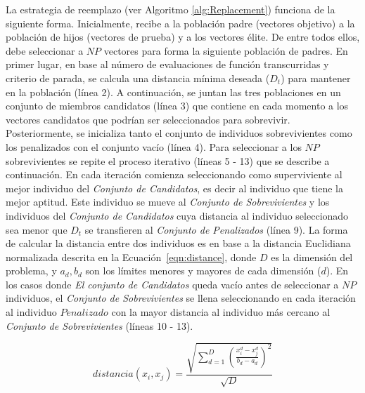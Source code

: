 La estrategia de reemplazo (ver Algoritmo \ref{alg:Replacement}) funciona de la siguiente forma.
%
Inicialmente, recibe a la población padre (vectores objetivo) a la población de hijos (vectores de prueba) y a los vectores élite.
%
De entre todos ellos, debe seleccionar a $NP$ vectores para forma la siguiente población de padres.
%
En primer lugar, en base al número de evaluaciones de función transcurridas y criterio de parada, se calcula una distancia mínima deseada ($D_t$) para mantener 
en la población (línea 2).
%
A continuación, se juntan las tres poblaciones en un conjunto de miembros candidatos (línea 3) que contiene en cada momento a los vectores candidatos 
que podrían ser seleccionados para sobrevivir.
%
Posteriormente, se inicializa tanto el conjunto de individuos sobrevivientes como los penalizados con el conjunto vacío (línea 4).
%
Para seleccionar a los $NP$ sobrevivientes se repite el proceso iterativo (líneas 5 - 13) que se describe a continuación.
%
En cada iteración comienza seleccionando como superviviente al mejor individuo del \textit{Conjunto de Candidatos}, es decir al individuo que tiene la mejor aptitud.
%
Este individuo se mueve al \textit{Conjunto de Sobrevivientes} y los individuos del \textit{Conjunto de Candidatos} cuya distancia al individuo seleccionado sea menor 
que $D_t$ se transfieren al \textit{Conjunto de Penalizados} (línea 9).
%
La forma de calcular la distancia entre dos individuos es en base a la distancia Euclidiana normalizada descrita en la Ecuación~\ref{eqn:distance}, 
donde $D$ es la dimensión del problema, y $a_d, b_d$ son los límites menores y mayores de cada dimensión ($d$).
%
En los casos donde \textit{El conjunto de Candidatos} queda vacío antes de seleccionar a $NP$ individuos, 
el \textit{Conjunto de Sobrevivientes} se llena seleccionando en cada iteración al individuo $Penalizado$ con la mayor distancia al individuo más cercano 
al \textit{Conjunto de Sobrevivientes} (líneas 10 - 13).

\begin{equation}\label{eqn:distance}
distancia ( x_{i}, x_j ) = \frac{\sqrt{ \sum_{d=1}^D \left ( \frac{x_{i}^d - x_j^d}{b_d - a_d} \right )^2  }} {\sqrt{D}}
\end{equation}


